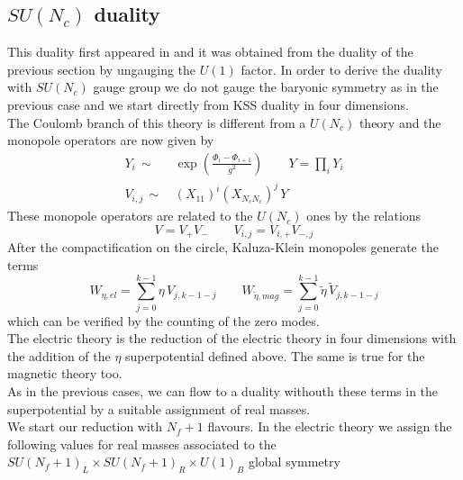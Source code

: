 \subsection{ $SU(N_c)$ duality }
\label{sec:reduction_kss_sun}
This duality first appeared in \cite{Park:2013wta} and it was obtained from the duality of the previous section by ungauging the $U(1)$ factor.
In order to derive the duality with $SU(N_c)$ gauge group we do not gauge the baryonic symmetry as in the previous case and we start directly from KSS duality in four dimensions.
\\
The Coulomb branch of this theory is different from a $U(N_c)$ theory and the monopole operators are now given by \cite{Nii:2014jsa}
\begin{align}
Y_i \, \sim \, & \exp \left(   \frac{ \Phi_i - \Phi_{i+1}}{g^2}  \right) \qquad 
Y = \prod_i Y_i
\\
V_{i,j} \, \sim \, & (X_{11})^i (X_{N_c N_c})^j\, Y
\end{align}
These monopole operators are related to the $U(N_c)$ ones by the relations
\begin{equation}
 V = V_+ V_- \qquad V_{i,j} = V_{i,+} V_{-,j}
 \end{equation} 
After the compactification on the circle, Kaluza-Klein monopoles generate the terms \cite{Nii:2014jsa}
\begin{equation}
W_{\eta, el} = \sum_{j=0}^{k-1} \eta \, V_{j,k-1-j} \qquad W_{\tilde{\eta}, mag} = \sum_{j=0}^{k-1 } \tilde{\eta} \, \tilde{V}_{j,k-1-j} 
\end{equation}  
which can be verified by the counting of the zero modes.\\
The electric theory is the reduction of the electric theory in four dimensions with the addition of the $\eta$ superpotential defined above.
The same is true for the magnetic theory too.\\
As in the previous cases, we can flow to a duality withouth these terms in the superpotential by a suitable assignment of real masses.\\ 
We start our reduction with $N_f+1$ flavours.
In the electric theory we assign the following values for real masses associated to the $SU(N_f+1)_L \times SU(N_f+1)_R \times U(1)_B$ global symmetry
